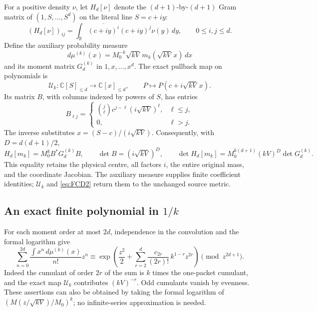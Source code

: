 For a positive density \(\nu\), let \(H_d[\nu]\) denote the
\((d+1)\)-by-\((d+1)\) Gram matrix of
\((1,S,\ldots,S^d)\) on the literal line \(S=c+iy\):
\[
 (H_d[\nu])_{ij}
   =\int_{\mathbb R}\overline{(c+iy)^i}(c+iy)^j\nu(y)\,dy,
       \qquad 0\le i,j\le d.
\]
Define the auxiliary probability measure
\[
 d\mu^{(k)}(x)
  =M_0^{-k}\sqrt{kV}\,m_k(\sqrt{kV}\,x)\,dx
\]
and its moment matrix \(G_d^{(k)}\) in \(1,x,\ldots,x^d\).
The exact pullback map on polynomials is
\[
 \mathcal U_k:\mathbb C[S]_{\le d}\longrightarrow\mathbb C[x]_{\le d},
 \qquad P\longmapsto P(c+i\sqrt{kV}\,x).
\]
Its matrix \(B\), with columns indexed by powers of \(S\), has entries
\[
 B_{\ell j}=
 \begin{cases}
 \binom j\ell c^{j-\ell}(i\sqrt{kV})^\ell,&\ell\le j,\\
 0,&\ell>j .
 \end{cases}
\]
The inverse substitutes \(x=(S-c)/(i\sqrt{kV})\).
Consequently, with \(D=d(d+1)/2\),
\begin{equation}
 H_d[m_k]=M_0^kB^*G_d^{(k)}B,\qquad
 \det B=(i\sqrt{kV})^D,\qquad
 \det H_d[m_k]=M_0^{k(d+1)}(kV)^D\det G_d^{(k)} .
 \tag{FCD2}\label{eq:FCD2}
\end{equation}
This equality retains the physical centre, all factors \(i\), the entire
original mass, and the coordinate Jacobian. The auxiliary measure supplies
finite coefficient identities; \(\mathcal U_k\) and \eqref{eq:FCD2}
return them to the unchanged source metric.

\subsection{An exact finite polynomial in \(1/k\)}

For each moment order at most \(2d\), independence in the convolution and
the formal logarithm give
\begin{equation}
 \sum_{n=0}^{2d}\frac{\int x^n\,d\mu^{(k)}(x)}{n!}z^n
 \equiv
 \exp\left(\frac{z^2}{2}
       +\sum_{r=2}^{d}\frac{c_{2r}}{(2r)!}\,
                    k^{1-r}z^{2r}\right)\pmod {z^{2d+1}}.
 \tag{FCD3}\label{eq:FCD3}
\end{equation}
Indeed the cumulant of order \(2r\) of the sum is \(k\) times the
one-packet cumulant, and the exact map \(\mathcal U_k\) contributes
\((kV)^{-r}\). Odd cumulants vanish by evenness. These assertions can
also be obtained by taking the formal logarithm of
\((M(z/\sqrt{kV})/M_0)^k\); no infinite-series approximation is needed.

